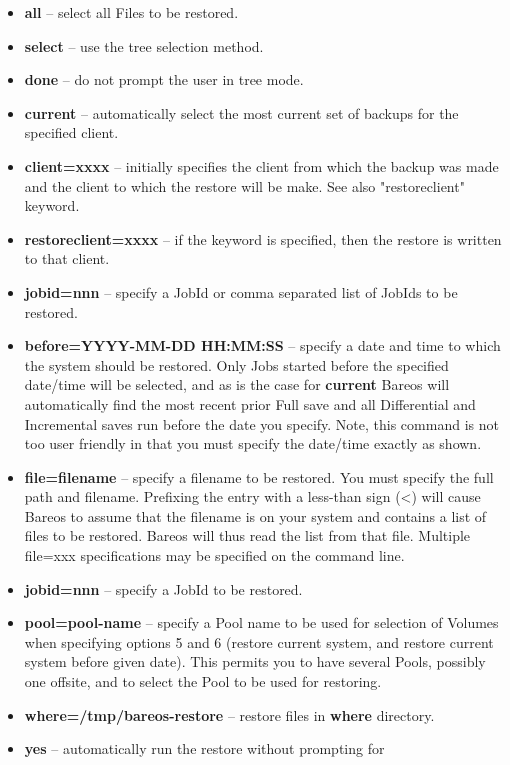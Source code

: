 \begin{itemize}
\item {\bf all} -- select all Files to be restored.
\item {\bf select} -- use the tree selection method.
\item {\bf done} -- do not prompt the user in tree mode.
\item {\bf current} -- automatically select the most current set of  backups
   for the specified client.
\item {\bf client=xxxx} -- initially specifies the client from which the
   backup was made and the client to which the restore will be make.  See also
   "restoreclient" keyword.
\item {\bf restoreclient=xxxx} -- if the keyword is specified, then the
   restore is written to that client.
\item {\bf jobid=nnn} -- specify a JobId or comma separated list of  JobIds to
   be restored.
\item {\bf before=YYYY-MM-DD HH:MM:SS} -- specify a date and time to  which
   the system should be restored. Only Jobs started before  the specified
   date/time will be selected, and as is the case  for {\bf current} Bareos will
   automatically find the most  recent prior Full save and all Differential and
   Incremental  saves run before the date you specify. Note, this command is  not
   too user friendly in that you must specify the date/time  exactly as shown.
\item {\bf file=filename} -- specify a filename to be restored. You  must
   specify the full path and filename. Prefixing the entry  with a less-than
   sign
   ({\textless}) will cause Bareos to assume that the  filename is on your system and
   contains a list of files to be  restored. Bareos will thus read the list from
   that file. Multiple  file=xxx specifications may be specified on the command
   line.
\item {\bf jobid=nnn} -- specify a JobId to be restored.
\item {\bf pool=pool-name} -- specify a Pool name to be used for selection  of
   Volumes when specifying options 5 and 6 (restore current system,  and restore
   current system before given date). This permits you to  have several Pools,
   possibly one offsite, and to select the Pool to  be used for restoring.
\item {\bf where=/tmp/bareos-restore} -- restore files in {\bf where} directory.
\item {\bf yes} -- automatically run the restore without prompting  for

\end{itemize}
